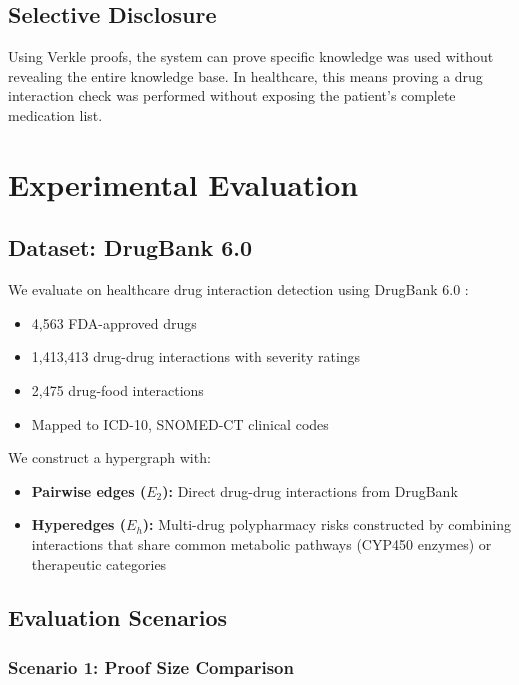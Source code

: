 \documentclass[11pt,a4paper]{article}
\begin{document}
\subsection{Selective Disclosure}

Using Verkle proofs, the system can prove specific knowledge was used without revealing the entire knowledge base. In healthcare, this means proving a drug interaction check was performed without exposing the patient's complete medication list.

\section{Experimental Evaluation}
\label{sec:experiments}

\subsection{Dataset: DrugBank 6.0}

We evaluate on healthcare drug interaction detection using DrugBank 6.0 \citep{knox2024drugbank6}:

\begin{itemize}[noitemsep]
    \item 4,563 FDA-approved drugs
    \item 1,413,413 drug-drug interactions with severity ratings
    \item 2,475 drug-food interactions
    \item Mapped to ICD-10, SNOMED-CT clinical codes
\end{itemize}

We construct a hypergraph with:
\begin{itemize}[noitemsep]
    \item \textbf{Pairwise edges ($E_2$):} Direct drug-drug interactions from DrugBank
    \item \textbf{Hyperedges ($E_h$):} Multi-drug polypharmacy risks constructed by combining interactions that share common metabolic pathways (CYP450 enzymes) or therapeutic categories
\end{itemize}

\subsection{Evaluation Scenarios}

\subsubsection{Scenario 1: Proof Size Comparison}
\end{document}
